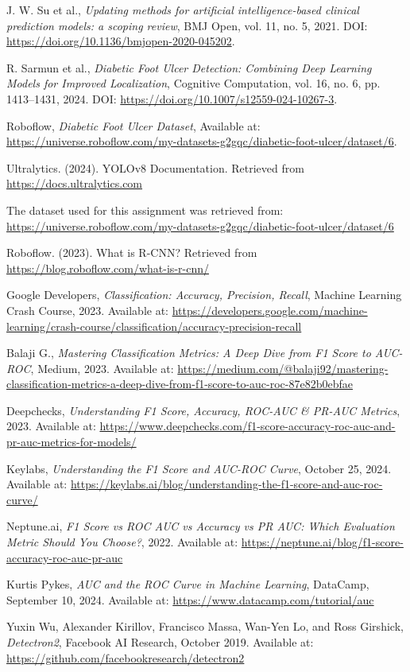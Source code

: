 \documentclass[a4paper,12pt]{report}
\begin{document}
\begin{thebibliography}{8}
J. W. Su et al., 
\textit{Updating methods for artificial intelligence-based clinical prediction models: a scoping review}, 
BMJ Open, vol. 11, no. 5, 2021. DOI: \url{https://doi.org/10.1136/bmjopen-2020-045202}.

R. Sarmun et al., 
\textit{Diabetic Foot Ulcer Detection: Combining Deep Learning Models for Improved Localization}, 
Cognitive Computation, vol. 16, no. 6, pp. 1413--1431, 2024. DOI: \url{https://doi.org/10.1007/s12559-024-10267-3}.

Roboflow,  
\textit{Diabetic Foot Ulcer Dataset},  
Available at: \url{https://universe.roboflow.com/my-datasets-g2gqc/diabetic-foot-ulcer/dataset/6}.

Ultralytics. (2024). YOLOv8 Documentation. 
Retrieved from \url{https://docs.ultralytics.com}

The dataset used for this assignment was retrieved from: \url{https://universe.roboflow.com/my-datasets-g2gqc/diabetic-foot-ulcer/dataset/6}

Roboflow. (2023). What is R-CNN?  
Retrieved from \url{https://blog.roboflow.com/what-is-r-cnn/}

Google Developers, 
\textit{Classification: Accuracy, Precision, Recall}, 
Machine Learning Crash Course, 2023. 
Available at: \url{https://developers.google.com/machine-learning/crash-course/classification/accuracy-precision-recall}

Balaji G., 
\textit{Mastering Classification Metrics: A Deep Dive from F1 Score to AUC-ROC}, 
Medium, 2023. 
Available at: \url{https://medium.com/@balaji92/mastering-classification-metrics-a-deep-dive-from-f1-score-to-auc-roc-87e82b0ebfae}

Deepchecks,
\textit{Understanding F1 Score, Accuracy, ROC-AUC \& PR-AUC Metrics},
2023.
Available at: \url{https://www.deepchecks.com/f1-score-accuracy-roc-auc-and-pr-auc-metrics-for-models/}

Keylabs,
\textit{Understanding the F1 Score and AUC-ROC Curve},
October 25, 2024.
Available at: \url{https://keylabs.ai/blog/understanding-the-f1-score-and-auc-roc-curve/}

Neptune.ai,
\textit{F1 Score vs ROC AUC vs Accuracy vs PR AUC: Which Evaluation Metric Should You Choose?},
2022.
Available at: \url{https://neptune.ai/blog/f1-score-accuracy-roc-auc-pr-auc}

Kurtis Pykes,
\textit{AUC and the ROC Curve in Machine Learning},
DataCamp, September 10, 2024.
Available at: \url{https://www.datacamp.com/tutorial/auc}

Yuxin Wu, Alexander Kirillov, Francisco Massa, Wan-Yen Lo, and Ross Girshick,  
\textit{Detectron2},  
Facebook AI Research, October 2019.  
Available at: \url{https://github.com/facebookresearch/detectron2}


\end{thebibliography}
\end{document}
